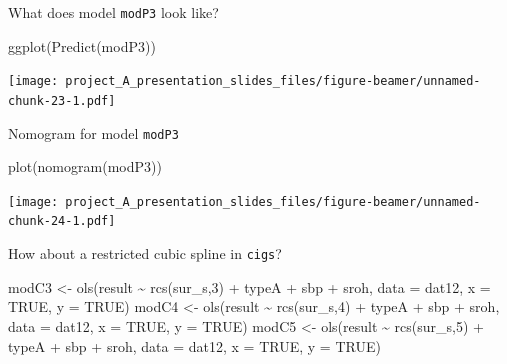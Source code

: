 \documentclass[
  ignorenonframetext,
]{beamer}
\newenvironment{Shaded}{\begin{snugshade}}{\end{snugshade}}
\newcommand{\AttributeTok}[1]{\textcolor[rgb]{0.77,0.63,0.00}{#1}}
\newcommand{\ConstantTok}[1]{\textcolor[rgb]{0.00,0.00,0.00}{#1}}
\newcommand{\DecValTok}[1]{\textcolor[rgb]{0.00,0.00,0.81}{#1}}
\newcommand{\FunctionTok}[1]{\textcolor[rgb]{0.00,0.00,0.00}{#1}}
\newcommand{\NormalTok}[1]{#1}
\newcommand{\OtherTok}[1]{\textcolor[rgb]{0.56,0.35,0.01}{#1}}
\newcommand{\SpecialCharTok}[1]{\textcolor[rgb]{0.00,0.00,0.00}{#1}}
\begin{document}
\begin{frame}[fragile]{What does model \texttt{modP3} look like?}
\protect\hypertarget{what-does-model-modp3-look-like}{}
\begin{Shaded}
\begin{Highlighting}[]
\FunctionTok{ggplot}\NormalTok{(}\FunctionTok{Predict}\NormalTok{(modP3))}
\end{Highlighting}
\end{Shaded}

\texttt{[image: project\_A\_presentation\_slides\_files/figure-beamer/unnamed-chunk-23-1.pdf]}
\end{frame}

\begin{frame}[fragile]{Nomogram for model \texttt{modP3}}
\protect\hypertarget{nomogram-for-model-modp3}{}
\begin{Shaded}
\begin{Highlighting}[]
\FunctionTok{plot}\NormalTok{(}\FunctionTok{nomogram}\NormalTok{(modP3))}
\end{Highlighting}
\end{Shaded}

\texttt{[image: project\_A\_presentation\_slides\_files/figure-beamer/unnamed-chunk-24-1.pdf]}
\end{frame}

\begin{frame}[fragile]{How about a restricted cubic spline in
\texttt{cigs}?}
\protect\hypertarget{how-about-a-restricted-cubic-spline-in-cigs}{}
\begin{Shaded}
\begin{Highlighting}[]
\NormalTok{modC3 }\OtherTok{\textless{}{-}} \FunctionTok{ols}\NormalTok{(result }\SpecialCharTok{\textasciitilde{}} \FunctionTok{rcs}\NormalTok{(sur\_s,}\DecValTok{3}\NormalTok{) }\SpecialCharTok{+}\NormalTok{ typeA }\SpecialCharTok{+}\NormalTok{ sbp }\SpecialCharTok{+}\NormalTok{ sroh, }
               \AttributeTok{data =}\NormalTok{ dat12, }\AttributeTok{x =} \ConstantTok{TRUE}\NormalTok{, }\AttributeTok{y =} \ConstantTok{TRUE}\NormalTok{)}
\NormalTok{modC4 }\OtherTok{\textless{}{-}} \FunctionTok{ols}\NormalTok{(result }\SpecialCharTok{\textasciitilde{}} \FunctionTok{rcs}\NormalTok{(sur\_s,}\DecValTok{4}\NormalTok{) }\SpecialCharTok{+}\NormalTok{ typeA }\SpecialCharTok{+}\NormalTok{ sbp }\SpecialCharTok{+}\NormalTok{ sroh, }
               \AttributeTok{data =}\NormalTok{ dat12, }\AttributeTok{x =} \ConstantTok{TRUE}\NormalTok{, }\AttributeTok{y =} \ConstantTok{TRUE}\NormalTok{)}
\NormalTok{modC5 }\OtherTok{\textless{}{-}} \FunctionTok{ols}\NormalTok{(result }\SpecialCharTok{\textasciitilde{}} \FunctionTok{rcs}\NormalTok{(sur\_s,}\DecValTok{5}\NormalTok{) }\SpecialCharTok{+}\NormalTok{ typeA }\SpecialCharTok{+}\NormalTok{ sbp }\SpecialCharTok{+}\NormalTok{ sroh, }
               \AttributeTok{data =}\NormalTok{ dat12, }\AttributeTok{x =} \ConstantTok{TRUE}\NormalTok{, }\AttributeTok{y =} \ConstantTok{TRUE}\NormalTok{)}
\end{Highlighting}
\end{Shaded}
\end{frame}
\end{document}
